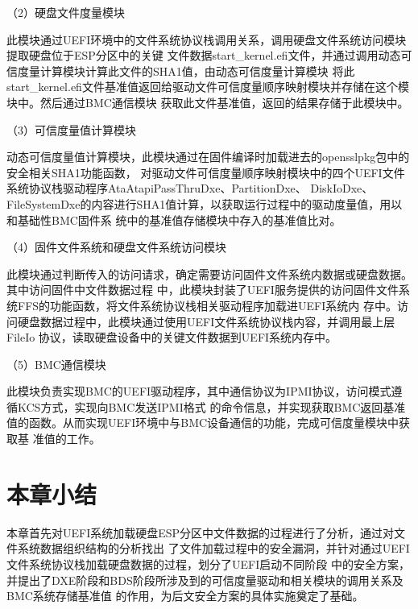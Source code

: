 \par （2）硬盘文件度量模块
\par 此模块通过UEFI环境中的文件系统协议栈调用关系，调用硬盘文件系统访问模块提取硬盘位于ESP分区中的关键
文件数据start\_kernel.efi文件，并通过调用动态可信度量计算模块计算此文件的SHA1值，由动态可信度量计算模块
将此start\_kernel.efi文件基准值返回给驱动文件可信度量顺序映射模块并存储在这个模块中。然后通过BMC通信模块
获取此文件基准值，返回的结果存储于此模块中。

\par （3）可信度量值计算模块
\par 动态可信度量值计算模块，此模块通过在固件编译时加载进去的opensslpkg包中的安全相关SHA1功能函数，
对驱动文件可信度量顺序映射模块中的四个UEFI文件系统协议栈驱动程序AtaAtapiPassThruDxe、PartitionDxe、
DiskIoDxe、FileSystemDxe的内容进行SHA1值计算，以获取运行过程中的驱动度量值，用以和基础性BMC固件系
统中的基准值存储模块中存入的基准值比对。

\par （4）固件文件系统和硬盘文件系统访问模块
\par 此模块通过判断传入的访问请求，确定需要访问固件文件系统内数据或硬盘数据。其中访问固件中文件数据过程
中，此模块封装了UEFI服务提供的访问固件文件系统FFS的功能函数，将文件系统协议栈相关驱动程序加载进UEFI系统内
存中。访问硬盘数据过程中，此模块通过使用UEFI文件系统协议栈内容，并调用最上层FileIo
协议，读取硬盘设备中的关键文件数据到UEFI系统内存中。

\par （5）BMC通信模块
\par 此模块负责实现BMC的UEFI驱动程序，其中通信协议为IPMI协议，访问模式遵循KCS方式，实现向BMC发送IPMI格式
的命令信息，并实现获取BMC返回基准值的函数。从而实现UEFI环境中与BMC设备通信的功能，完成可信度量模块中获取基
准值的工作。

%
%
\section{本章小结}
本章首先对UEFI系统加载硬盘ESP分区中文件数据的过程进行了分析，通过对文件系统数据组织结构的分析找出
了文件加载过程中的安全漏洞，并针对通过UEFI文件系统协议栈加载硬盘数据的过程，划分了UEFI启动不同阶段
中的安全方案，并提出了DXE阶段和BDS阶段所涉及到的可信度量驱动和相关模块的调用关系及BMC系统存储基准值
的作用，为后文安全方案的具体实施奠定了基础。

